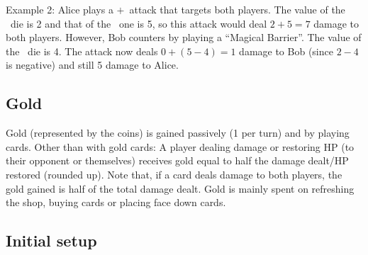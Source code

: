 \documentclass[dvipsnames,parskip,a4paper]{scrartcl}
\newcommand{\iconsize}{3.4mm}
\newcommand{\icondepth}{0.45mm}
\newcommand{\icon}[1]{\raisebox{-\icondepth}{\texttt{[image:  \#1 ]}}}
\newcommand{\earth}{\icon{icons/earth.png}}
\newcommand{\water}{\icon{icons/water.png}}
\newcommand{\magic}{\icon{icons/magic.png}}
\begin{document}
\vspace{4pt}

Example 2: Alice plays a \water\hspace{1pt}$+$\hspace{1pt}\earth \ attack that targets both players. The value of the \water \ die is 2 and that of the \earth \ one is 5, so this attack would deal $2 + 5 = 7$ damage to both players. However, Bob counters by playing a ``Magical Barrier''. The value of the \magic \ die is 4. The attack now deals $0 + (5 - 4) = 1$ damage to Bob (since $2 - 4$ is negative) and still 5 damage to Alice.

\subsection*{Gold}

Gold (represented by the coins) is gained passively (1 per turn) and by playing cards. Other than with gold cards: A player dealing damage or restoring HP (to their opponent or themselves) receives gold equal to half the damage dealt/HP restored (rounded up). Note that, if a card deals damage to both players, the gold gained is half of the total damage dealt. Gold is mainly spent on refreshing the shop, buying cards or placing face down cards.

\subsection*{Initial setup}
\end{document}
